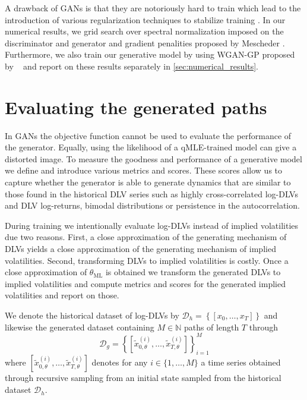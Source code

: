 \documentclass[]{article} %
\begin{document}
A drawback of GANs is that they are notoriously hard to train which lead to the introduction of various regularization techniques to stabilize training \cite{Arjovsky2017, Brock2018, Gulrajani2017, Mescheder2018, Miyato2018, Sonderby2016}. In our numerical results, we grid search over spectral normalization \cite{Miyato2018} imposed on the discriminator and generator \cite{Brock2018} and gradient penalities proposed by Mescheder \cite{Mescheder2018}.
Furthermore, we also train our generative model by using WGAN-GP proposed by ~\cite{Gulrajani2017} and report on these results separately in \autoref{sec:numerical_results}. 

\section{Evaluating the generated paths}
\label{sec:evaluation}
In GANs the objective function cannot be used to evaluate the performance of the generator. Equally, using the likelihood of a qMLE-trained model can give a distorted image. To measure the goodness and performance of a generative model we define and introduce various metrics and scores. These scores allow us to capture whether the generator is able to generate dynamics that are similar to those found in the historical DLV series such as highly cross-correlated log-DLVs and DLV log-returns, bimodal distributions or persistence in the autocorrelation. 

During training we intentionally evaluate log-DLVs instead of implied volatilities due two reasons. First, a close approximation of the generating mechanism of DLVs yields a close approximation of the generating mechanism of implied volatilities. Second, transforming DLVs to implied volatilities is costly. Once a close approximation of $\theta_{\textrm{ML}}$ is obtained we transform the generated DLVs to implied volatilities and compute metrics and scores for the generated implied volatilities and report on those. 

We denote the historical dataset of log-DLVs by $\mathcal{D}_h= \left\lbrace [x_0, \dots, x_T] \right\rbrace$ and likewise the generated dataset containing $M \in \mathbb{N}$ paths of length $T$ through
\[
\mathcal{D}_g = \left\lbrace[\tilde x^{(i)}_{0, \theta}, \dots, \tilde  x^{(i)}_{T, \theta}]\right\rbrace_{i=1}^{M}
\]
where $[\tilde x^{(i)}_{0, \theta}, \dots, \tilde  x^{(i)}_{T, \theta}]$ denotes for any $i \in\lbrace1, \dots, M\rbrace$ a time series obtained through recursive sampling from an initial state sampled from the historical dataset $\mathcal{D}_h$.
\end{document}
